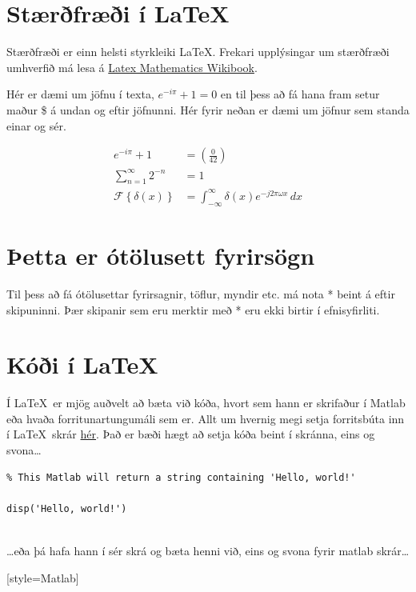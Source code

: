 \documentclass[a4paper]{article}
\begin{document}
\section{Stærðfræði í \LaTeX}
Stærðfræði er einn helsti styrkleiki \LaTeX. Frekari upplýsingar um stærðfræði umhverfið má lesa á \href{http://en.wikibooks.org/wiki/LaTeX/Mathematics}{Latex Mathematics Wikibook}.

Hér er dæmi um jöfnu í texta, $e^{-i\pi} + 1 = 0$ en til þess að fá hana fram setur maður \$ á undan og eftir jöfnunni. Hér fyrir neðan er dæmi um jöfnur sem standa einar og sér.


\begin{align}
	e^{-i\pi} + 1 &= \left(\frac{0}{42}\right) \\ %
    \sum_{n=1}^{\infty} 2^{-n} &= 1 \\
    \mathcal{F}\left\{ \delta(x) \right\} &= \int_{-\infty}^{\infty} \delta(x) e^{-j 2 \pi \omega x}\,dx\nonumber %
\end{align}

\pagebreak %

\section*{Þetta er ótölusett fyrirsögn}
Til þess að fá ótölusettar fyrirsagnir, töflur, myndir etc. má nota * beint á eftir skipuninni. Þær skipanir sem eru merktir með * eru ekki birtir í efnisyfirliti.


\section{Kóði í \LaTeX}
Í \LaTeX\ er mjög auðvelt að bæta við kóða, hvort sem hann er skrifaður í Matlab eða hvaða forritunartungumáli sem er. Allt um hvernig megi setja forritsbúta inn í \LaTeX\ skrár \href{http://en.wikibooks.org/wiki/LaTeX/Source_Code_Listings#Settings}{hér}.
Það er bæði hægt að setja kóða beint í skránna, eins og svona\dots

\begin{lstlisting}
% This Matlab will return a string containing 'Hello, world!'

disp('Hello, world!')


\end{lstlisting}

\dots eða þá hafa hann í sér skrá og bæta henni við, eins og svona fyrir matlab skrár\dots

[style=Matlab]
\end{document}

